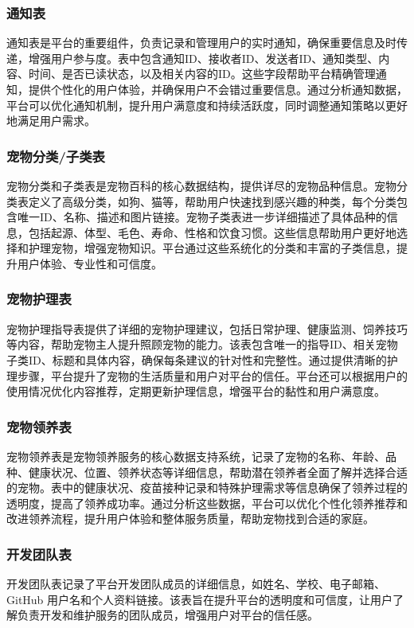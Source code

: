 \subsubsection{通知表}

通知表是平台的重要组件，负责记录和管理用户的实时通知，确保重要信息及时传递，增强用户参与度。表中包含通知ID、接收者ID、发送者ID、通知类型、内容、时间、是否已读状态，以及相关内容的ID。这些字段帮助平台精确管理通知，提供个性化的用户体验，并确保用户不会错过重要信息。通过分析通知数据，平台可以优化通知机制，提升用户满意度和持续活跃度，同时调整通知策略以更好地满足用户需求。

\subsubsection{宠物分类/子类表}

宠物分类和子类表是宠物百科的核心数据结构，提供详尽的宠物品种信息。宠物分类表定义了高级分类，如狗、猫等，帮助用户快速找到感兴趣的种类，每个分类包含唯一ID、名称、描述和图片链接。宠物子类表进一步详细描述了具体品种的信息，包括起源、体型、毛色、寿命、性格和饮食习惯。这些信息帮助用户更好地选择和护理宠物，增强宠物知识。平台通过这些系统化的分类和丰富的子类信息，提升用户体验、专业性和可信度。

\subsubsection{宠物护理表}

宠物护理指导表提供了详细的宠物护理建议，包括日常护理、健康监测、饲养技巧等内容，帮助宠物主人提升照顾宠物的能力。该表包含唯一的指导ID、相关宠物子类ID、标题和具体内容，确保每条建议的针对性和完整性。通过提供清晰的护理步骤，平台提升了宠物的生活质量和用户对平台的信任。平台还可以根据用户的使用情况优化内容推荐，定期更新护理信息，增强平台的黏性和用户满意度。

\subsubsection{宠物领养表}

宠物领养表是宠物领养服务的核心数据支持系统，记录了宠物的名称、年龄、品种、健康状况、位置、领养状态等详细信息，帮助潜在领养者全面了解并选择合适的宠物。表中的健康状况、疫苗接种记录和特殊护理需求等信息确保了领养过程的透明度，提高了领养成功率。通过分析这些数据，平台可以优化个性化领养推荐和改进领养流程，提升用户体验和整体服务质量，帮助宠物找到合适的家庭。

\subsubsection{开发团队表}

开发团队表记录了平台开发团队成员的详细信息，如姓名、学校、电子邮箱、GitHub 用户名和个人资料链接。该表旨在提升平台的透明度和可信度，让用户了解负责开发和维护服务的团队成员，增强用户对平台的信任感。
